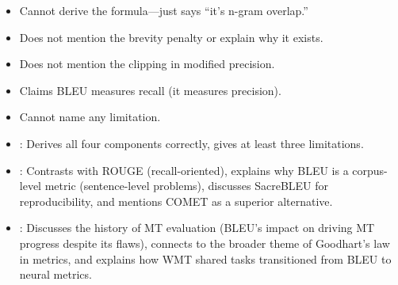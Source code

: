 \begin{interviewq}
\redflags
\begin{itemize}
    \item Cannot derive the formula---just says ``it's n-gram overlap.''
    \item Does not mention the brevity penalty or explain why it exists.
    \item Does not mention the clipping in modified precision.
    \item Claims BLEU measures recall (it measures precision).
    \item Cannot name any limitation.
\end{itemize}


\goodgreat
\begin{itemize}
    \item {}: Derives all four components correctly, gives at least
          three limitations.
    \item {}: Contrasts with ROUGE (recall-oriented), explains
          why BLEU is a corpus-level metric (sentence-level problems), discusses
          SacreBLEU for reproducibility, and mentions COMET as a superior
          alternative.
    \item {}: Discusses the history of MT evaluation (BLEU's
          impact on driving MT progress despite its flaws), connects to the
          broader theme of Goodhart's law in metrics, and explains how WMT
          shared tasks transitioned from BLEU to neural metrics.
\end{itemize}

\end{interviewq}

\vspace{0.5em}

